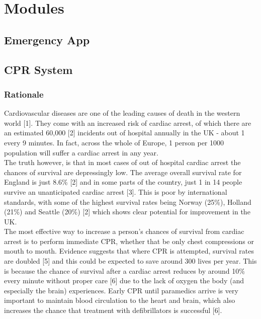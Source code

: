 \documentclass{article}
\begin{document}
\section{Modules}
    \subsection{Emergency App}
    
    \subsection{CPR System}
    	\subsubsection{Rationale}
    	Cardiovascular diseases are one of the leading causes of death in the western world [1]. They come with an increased risk of cardiac arrest, of which there are an estimated 60,000 [2] incidents out of hospital annually in the UK - about 1 every 9 minutes. In fact, across the whole of Europe, 1 person per 1000 population will suffer a cardiac arrest in any year.\\
    	
The truth however, is that in most cases of out of hospital cardiac arrest the chances of survival are depressingly low. The average overall survival rate for England is just 8.6\% [2] and in some parts of the country, just 1 in 14 people survive an unanticipated cardiac arrest [3]. This is poor by international standards, with some of the highest survival rates being Norway (25\%), Holland (21\%) and Seattle (20\%) [2] which shows clear potential for improvement in the UK.\\

The most effective way to increase a person’s chances of survival from cardiac arrest is to perform immediate CPR, whether that be only chest compressions or mouth to mouth. Evidence suggests that where CPR is attempted, survival rates are doubled [5] and this could be expected to save around 300 lives per year. This is because the chance of survival after a cardiac arrest reduces by around 10\% every minute without proper care [6] due to the lack of oxygen the body (and especially the brain) experiences. Early CPR until paramedics arrive is very important to maintain blood circulation to the heart and brain, which also increases the chance that treatment with defibrillators is successful [6].\\
\end{document}
